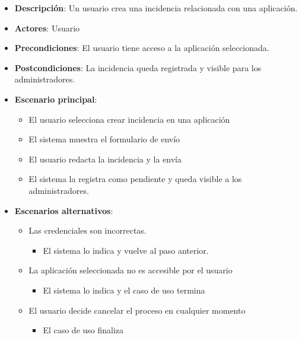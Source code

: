 \documentclass[12pt,a4paperpaper,]{report}
\providecommand{\tightlist}{%
  \setlength{\itemsep}{0pt}\setlength{\parskip}{0pt}}
\begin{document}
\begin{itemize}
\tightlist
\item
  \textbf{Descripción}: Un usuario crea una incidencia relacionada con
  una aplicación.
\item
  \textbf{Actores}: Usuario
\item
  \textbf{Precondiciones}: El usuario tiene acceso a la aplicación
  seleccionada.
\item
  \textbf{Postcondiciones}: La incidencia queda registrada y visible
  para los administradores.
\item
  \textbf{Escenario principal}:

  \begin{itemize}
  \tightlist
  \item
    El usuario selecciona crear incidencia en una aplicación
  \item
    El sistema muestra el formulario de envío
  \item
    El usuario redacta la incidencia y la envía
  \item
    El sistema la registra como pendiente y queda visible a los
    administradores.
  \end{itemize}
\item
  \textbf{Escenarios alternativos}:

  \begin{itemize}
  \tightlist
  \item
    Las credenciales son incorrectas.

    \begin{itemize}
    \tightlist
    \item
      El sistema lo indica y vuelve al paso anterior.
    \end{itemize}
  \item
    La aplicación seleccionada no es accesible por el usuario

    \begin{itemize}
    \tightlist
    \item
      El sistema lo indica y el caso de uso termina
    \end{itemize}
  \item
    El usuario decide cancelar el proceso en cualquier momento

    \begin{itemize}
    \tightlist
    \item
      El caso de uso finaliza
    \end{itemize}
  \end{itemize}
\end{itemize}
\end{document}
